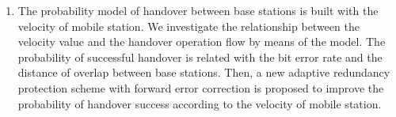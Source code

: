 {\begin{enumerate}[(1)]
    \item The probability model of handover between base stations is built with the velocity of mobile station. We investigate the relationship between the velocity value and the handover operation flow by means of the model. The probability of successful handover is related with the bit error rate and the distance of overlap between base stations. Then, a new adaptive  redundancy protection scheme with forward error correction is proposed to improve the probability of handover success according to the velocity of mobile station.
\end{enumerate}

}

